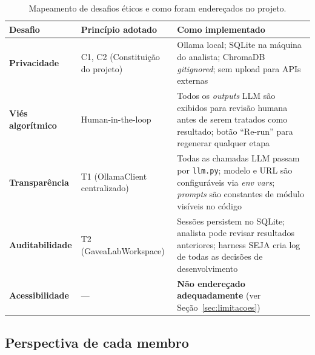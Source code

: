 \documentclass[12pt,a4paper]{article}
\begin{document}
\begin{table}[h!]
\centering
\small
\begin{tabular}{>{\bfseries}p{3cm} p{4cm} p{6cm}}
\toprule
Desafio & Princípio adotado & Como implementado \\
\midrule
Privacidade & C1, C2 (Constituição do projeto) &
  Ollama local; SQLite na máquina do analista; ChromaDB \textit{gitignored}; sem upload para APIs externas \\
\addlinespace
Viés algorítmico & Human-in-the-loop &
  Todos os \textit{outputs} LLM são exibidos para revisão humana antes de serem tratados como resultado; botão ``Re-run'' para regenerar qualquer etapa \\
\addlinespace
Transparência & T1 (OllamaClient centralizado) &
  Todas as chamadas LLM passam por \texttt{llm.py}; modelo e URL são configuráveis via \textit{env vars}; \textit{prompts} são constantes de módulo visíveis no código \\
\addlinespace
Auditabilidade & T2 (GaveaLabWorkspace) &
  Sessões persistem no SQLite; analista pode revisar resultados anteriores; harness SEJA cria log de todas as decisões de desenvolvimento \\
\addlinespace
Acessibilidade & — &
  \textbf{Não endereçado adequadamente} (ver Seção~\ref{sec:limitacoes}) \\
\bottomrule
\end{tabular}
\caption{Mapeamento de desafios éticos e como foram endereçados no projeto.}
\end{table}

\subsection{Perspectiva de cada membro}



\end{document}

